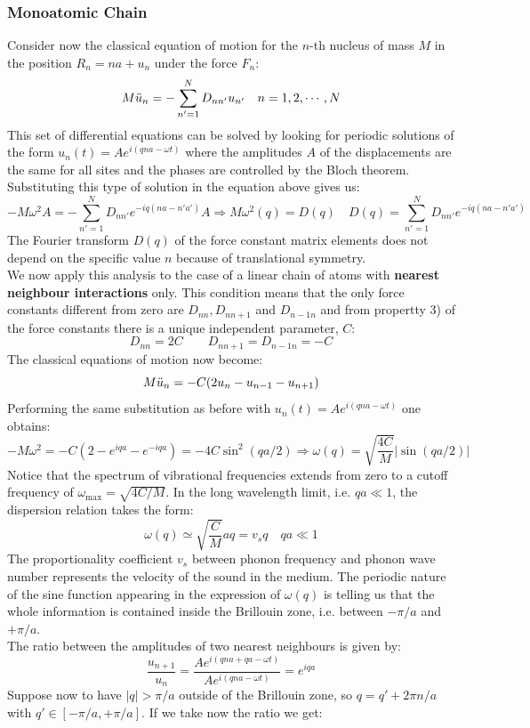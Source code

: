 \documentclass[10.75pt,a4paper,openright,bottom=2cm]{article}
\begin{document}
\subsubsection{Monoatomic Chain}
Consider now the classical equation of motion for the $n$-th nucleus of mass $M$ in the position $R_n=na+u_n$ under the force $F_n$:
\[
M\Ddot{u}_n=-\sum_{n'=1}^ND_{nn'}u_{n'} \quad n=1,2,\cdots,N
\]
This set of differential equations can be solved by looking for periodic solutions of the form $u_n(t)=Ae^{i(qna-\omega t)}$ where the amplitudes $A$ of the displacements are the same for all sites and the phases are controlled by the Bloch theorem. Substituting this type of solution in the equation above gives us:
\[
-M\omega^2A=-\sum_{n'=1}^ND_{nn'}e^{-iq(na-n'a')}A\Rightarrow M\omega^2(q)=D(q) \quad D(q)=\sum_{n'=1}^ND_{nn'}e^{-iq(na-n'a')}
\]
The Fourier transform $D(q)$ of the force constant matrix elements does not depend on the specific value $n$ because of translational symmetry.\\
We now apply this analysis to the case of a linear chain of atoms with \textbf{nearest neighbour interactions} only. This condition means that the only force constants different from zero are $D_{nn}, D_{nn+1}$ and $D_{n-1n}$ and from propertty 3) of the force constants there is a unique independent parameter, $C$:
\[
D_{nn}=2C \qquad D_{nn+1}=D_{n-1n}=-C
\]
The classical equations of motion now become:
\[
M\Ddot{u}_n=-C(2u_n-u_{n-1}-u_{n+1})
\]
Performing the same substitution as before with $u_n(t)=Ae^{i(qna-\omega t)}$ one obtains:
\[
-M\omega^2=-C(2-e^{iqa}-e^{-iqa})=-4C\sin^2(qa/2)\Rightarrow\omega(q)=\sqrt{\frac{4C}{M}}|\sin(qa/2)|
\]
Notice that the spectrum of vibrational frequencies extends from zero to a cutoff frequency of $\omega_{\max}=\sqrt{4C/M}$. In the long wavelength limit, i.e. $qa\ll1$, the dispersion relation takes the form:
\[
\omega(q)\simeq\sqrt{\frac{C}{M}}aq=v_sq \quad qa\ll1
\]
The proportionality coefficient $v_s$ between phonon frequency and phonon wave number represents the velocity of the sound in the medium. The periodic nature of the sine function appearing in the expression of $\omega(q)$ is telling us that the whole information is contained inside the  Brillouin zone, i.e. between $-\pi/a$ and $+\pi/a$.\\
The ratio between the amplitudes of two nearest neighbours is given by:
\[
\frac{u_{n+1}}{u_n}=\frac{Ae^{i(qna+qa-\omega t)}}{Ae^{i(qna-\omega t)}}=e^{iqa}
\]
Suppose now to have $|q|>\pi/a$ outside of the  Brillouin zone, so $q=q'+2\pi n/a$ with $q'\in[-\pi/a,+\pi/a]$. If we take now the ratio we get:
\end{document}
